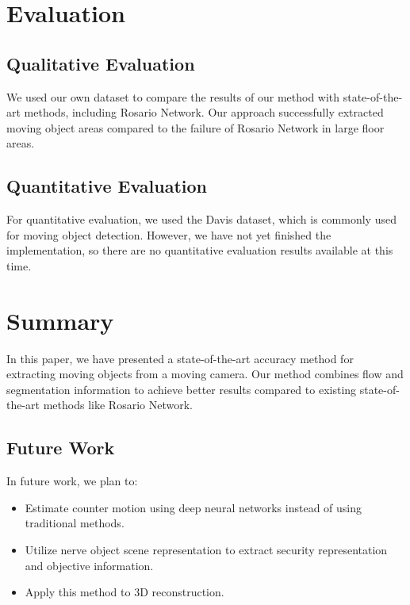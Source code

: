 \documentclass[10pt, twocolumn]{article}
\begin{document}
\section{Evaluation}

\subsection{Qualitative Evaluation}
We used our own dataset to compare the results of our method with state-of-the-art methods, including Rosario Network. Our approach successfully extracted moving object areas compared to the failure of Rosario Network in large floor areas.

\subsection{Quantitative Evaluation}
For quantitative evaluation, we used the Davis dataset, which is commonly used for moving object detection. However, we have not yet finished the implementation, so there are no quantitative evaluation results available at this time.

\section{Summary}
In this paper, we have presented a state-of-the-art accuracy method for extracting moving objects from a moving camera. Our method combines flow and segmentation information to achieve better results compared to existing state-of-the-art methods like Rosario Network.

\subsection{Future Work}
In future work, we plan to:

\begin{itemize}
  \item Estimate counter motion using deep neural networks instead of using traditional methods.
  \item Utilize nerve object scene representation to extract security representation and objective information.
  \item Apply this method to 3D reconstruction.
\end{itemize}



\end{document}
